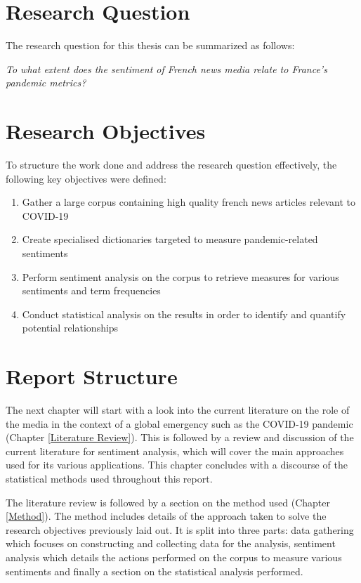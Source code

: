 \section{Research Question}\label{Research Question}

The research question for this thesis can be summarized as follows:

\begin{center}
    \emph{To what extent does the sentiment of French news media relate to France's pandemic metrics?}
\end{center}

\section{Research Objectives}\label{Research Objectives}
To structure the work done and address the research question effectively, the following key objectives were defined:
\begin{enumerate}
    \item Gather a large corpus containing high quality french news articles relevant to COVID-19
    \item Create specialised dictionaries targeted to measure pandemic-related sentiments
    \item Perform sentiment analysis on the corpus to retrieve measures for various sentiments and term frequencies
    \item Conduct statistical analysis on the results in order to identify and quantify potential relationships
\end{enumerate}

\section{Report Structure}\label{Report Structure}

The next chapter will start with a look into the current literature on the role of the media in the context of a global emergency such as the COVID-19 pandemic (Chapter \ref{Literature Review}). This is followed by a review and discussion of the current literature for sentiment analysis, which will cover the main approaches used for its various applications. This chapter concludes with a discourse of the statistical methods used throughout this report.

The literature review is followed by a section on the method used (Chapter \ref{Method}). The method includes details of the approach taken to solve the research objectives previously laid out. It is split into three parts: data gathering which focuses on constructing and collecting data for the analysis, sentiment analysis which details the actions performed on the corpus to measure various sentiments and finally a section on the statistical analysis performed.

